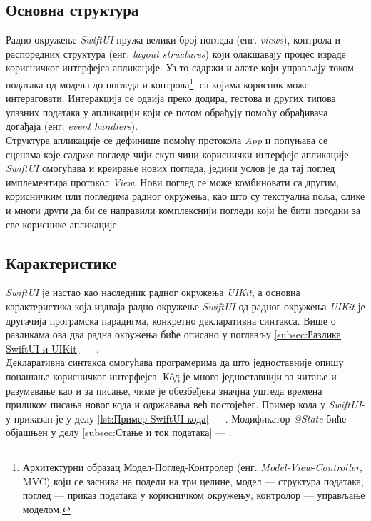 \documentclass[12pt,oneside]{memoir}
\begin{document}
\subsection{Основна структура}

\indent Радно окружење \textit{SwiftUI} пружа велики број погледа (енг. \textit{views}), контрола и распоредних структура (енг. \textit{layout structures}) који олакшавају процес израде корисничког интерфејса апликације. Уз то садржи и алате који управљају током података од модела до погледа и контрола\footnote{Архитектурни образац Модел-Поглед-Контролер (енг. \textit{Model-View-Controller}, MVC) који се заснива на подели на три целине, модел --- структура података, поглед --- приказ података у корисничком окружењу, контролор --- управљање моделом.}, са којима корисник може интераговати. Интеракција се одвија преко додира, гестова и других типова улазних података у апликацији који се потом обрађују помоћу обрађивача догађаја (енг. \textit{event handlers}).
\\
\indent Структура апликације се дефинише помоћу протокола \textit{App} и попуњава се сценама које садрже погледе чији скуп чини кориснички интерфејс апликације. \textit{SwiftUI} омогућава и креирање нових погледа, једини услов је да тај поглед имплементира протокол \textit{View}. Нови поглед се може комбиновати са другим, корисничким или погледима радног окружења, као што су текстуална поља, слике и многи други да би се направили комплекснији погледи који ће бити погодни за све кориснике апликације.

\subsection{Карактеристике}

\indent \textit{SwiftUI} је настао као наследник радног окружења \textit{UIKit}, а основна карактеристика која издваја радно окружење \textit{SwiftUI} од радног окружења \textit{UIKit} је другачија програмска парадигма, конкретно декларативна синтакса. Више о разликама ова два радна окружења биће описано у поглављу \ref{subsec:Разлика SwiftUI и UIKit} --- . 
\\
\indent Декларативна синтакса омогућава програмерима да што једноставније опишу понашање корисничког интерфејса. К\^{o}д је много једноставнији за читање и разумевање као и за писање, чиме је обезбеђена значјна уштеда времена приликом писања новог кода и одржавања већ постојећег. Пример кода у \textit{SwiftUI}-у приказан је у делу \ref{lst:Пример SwiftUI кода} --- . Модификатор \textit{@State} биће објашњен у делу \ref{subsec:Стање и ток података} --- .
\end{document}
